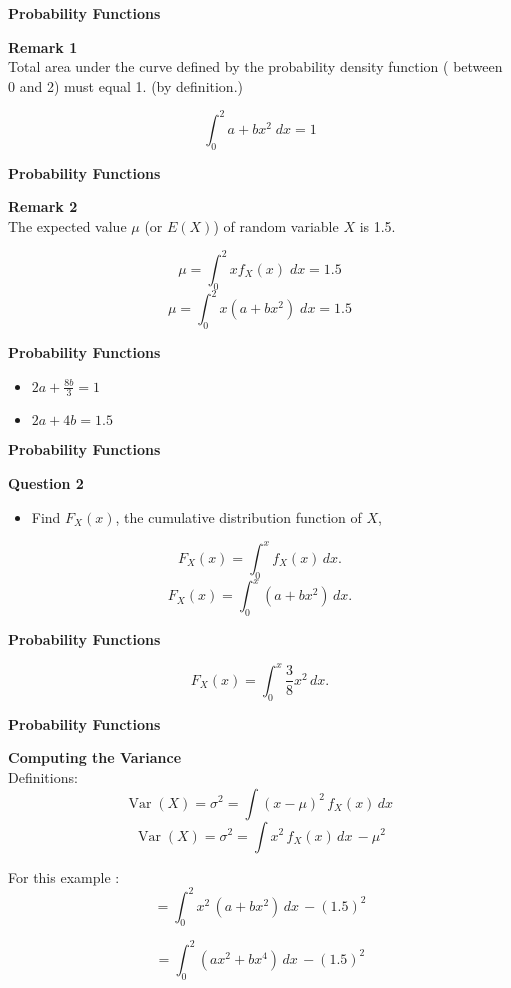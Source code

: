 \documentclass[12pt]{article}
\begin{document}
\newpage
{\LARGE
\begin{center}
\textbf{Probability Functions}\\
\end{center}
\bigskip
\textbf{Remark 1}\\
Total area under the curve defined by the probability density function ( between 0 and 2) must equal 1. (by definition.)

\[\int^{2}_{0} a+bx^2\; dx = 1\]
}
\newpage
{\LARGE
\begin{center}
\textbf{Probability Functions}\\
\end{center}
\bigskip
\textbf{Remark 2}\\
The expected value $\mu$ (or $E(X)$) of random variable $X$ is 1.5.

\[ \mu = \int^{2}_{0} x f_X(x)\; dx = 1.5\]
\[ \mu = \int^{2}_{0} x (a+bx^2)\; dx = 1.5\]

}
\newpage
{\LARGE
\begin{center}
\textbf{Probability Functions}\\
\end{center}
\bigskip
{ \Huge
\begin{itemize}
\item $2a + \frac{8b}{3} = 1$
\item $2a + 4b = 1.5$
\end{itemize}
}
}
\newpage
{\LARGE
\begin{center}
\textbf{Probability Functions}\\
\end{center}
\bigskip
\textbf{Question 2}\\
\begin{itemize}
\item Find $F_X(x)$, the cumulative distribution function of $X$,
\end{itemize}
\[F_X(x) = \int_{0}^x f_X(x)\,dx.\]
\[F_X(x) = \int_{0}^x (a+bx^2)\,dx.\]
}

\newpage
{\LARGE
\begin{center}
\textbf{Probability Functions}\\
\end{center}
\[F_X(x) = \int_{0}^x \frac{3}{8}x^2\,dx.\]
}
\newpage
{\LARGE
\begin{center}
\textbf{Probability Functions}\\
\end{center}
\bigskip
\textbf{Computing the Variance}\\ \bigskip
Definitions:
\[ \operatorname{Var}(X) =\sigma^2 =\int (x-\mu)^2 \, f_X(x) \, dx\, \]
\[ \operatorname{Var}(X) =\sigma^2  =\int x^2 \, f_X(x) \, dx\, - \mu^2\]
\bigskip

For this example :
\[ = \int^{2}_{0} x^2 \, \left( a+bx^2 \right) \, dx\, -(1.5)^2\]

\[   =\int^{2}_{0} (ax^2 + bx^4) \, dx\, - (1.5)^2\]
}

\newpage
\end{document}

